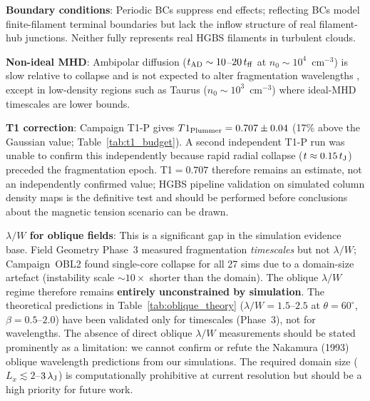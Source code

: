 \documentclass[twoside,twocolumn]{mnras}
\begin{document}
\textbf{Boundary conditions}: Periodic BCs suppress end effects; reflecting BCs model
finite-filament terminal boundaries but lack the inflow structure of real filament-hub
junctions. Neither fully represents real HGBS filaments in turbulent clouds.

\textbf{Non-ideal MHD}: Ambipolar diffusion ($t_{\rm AD} \sim 10$--$20\,t_{\rm ff}$ at
$n_0 \sim 10^4$~cm$^{-3}$) is slow relative to collapse and is not expected to alter
fragmentation wavelengths \citep{Nakamura2005, Tassis2004}, except in low-density regions
such as Taurus ($n_0 \sim 10^3$~cm$^{-3}$) where ideal-MHD timescales are lower bounds.

\textbf{T1 correction}: Campaign T1-P gives $T1_{\rm Plummer} = 0.707 \pm 0.04$ (17\% above the Gaussian value; Table~\ref{tab:t1_budget}). A second independent T1-P run was unable to confirm this independently because rapid radial collapse ($t \approx 0.15\,t_{\rm J}$) preceded the fragmentation epoch. T1$=0.707$ therefore remains an estimate, not an independently confirmed value; HGBS pipeline validation on simulated column density maps is the definitive test and should be performed before conclusions about the magnetic tension scenario can be drawn.

\textbf{$\lambda/W$ for oblique fields}: This is a significant gap in the simulation
evidence base. Field Geometry Phase~3 measured fragmentation \textit{timescales} but
not $\lambda/W$; Campaign~OBL2 found single-core collapse for all 27 sims due to a
domain-size artefact (instability scale ${\sim}10\times$ shorter than the domain).
The oblique $\lambda/W$ regime therefore remains \textbf{entirely unconstrained by
simulation}. The \citet{Nakamura1993} theoretical predictions in
Table~\ref{tab:oblique_theory} ($\lambda/W = 1.5$--$2.5$ at $\theta = 60^\circ$,
$\beta = 0.5$--$2.0$) have been validated only for timescales (Phase~3), not for
wavelengths. The absence of direct oblique $\lambda/W$ measurements should be stated
prominently as a limitation: we cannot confirm or refute the Nakamura (1993) oblique
wavelength predictions from our simulations. The required domain size
($L_x \lesssim 2$--$3\,\lambda_{\rm J}$) is computationally prohibitive at current
resolution but should be a high priority for future work.
\end{document}
